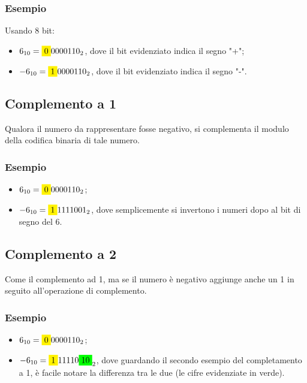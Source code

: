 \documentclass[12pt]{article}
\begin{document}
\subsubsection{Esempio}
Usando 8 bit:
\begin{itemize}
    \item $6_{10} = \colorbox{yellow}{0}0000110_2$, dove il bit evidenziato indica il segno "+";
    \item $-6_{10} = \colorbox{yellow}{1}0000110_2$, dove il bit evidenziato indica il segno "-".
\end{itemize}
\subsection{Complemento a 1}
Qualora il numero da rappresentare fosse negativo, si complementa il modulo della codifica binaria di tale numero.
\subsubsection{Esempio}
\begin{itemize}
    \item $6_{10} = \colorbox{yellow}{0}0000110_2$;
    \item $-6_{10} = \colorbox{yellow}{1}1111001_2$, dove semplicemente si invertono i numeri dopo al bit di segno del 6.
\end{itemize}
\subsection{Complemento a 2}
Come il complemento ad 1, ma se il numero è negativo aggiunge anche un 1 in seguito all'operazione di complemento.
\subsubsection{Esempio}
\begin{itemize}
    \item $6_{10} = \colorbox{yellow}{0}0000110_2$;
    \item $-6_{10} = \colorbox{yellow}{1}11110\colorbox{green}{10}_2$, dove guardando il secondo esempio del completamento a 1, è facile notare la differenza tra le due (le cifre evidenziate in verde).
\end{itemize}
\end{document}
